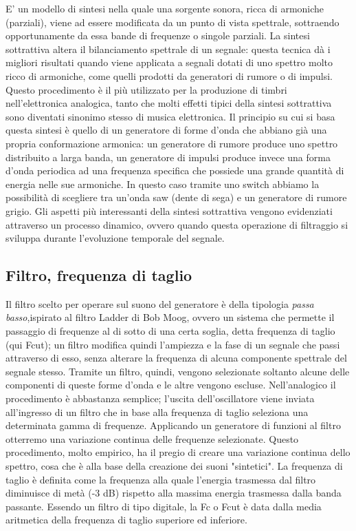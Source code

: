 \documentclass[
	a4paper,
	twocolumn
	]{article}
\begin{document}
E’ un modello di sintesi nella quale una sorgente sonora, ricca di armoniche
(parziali), viene ad essere modificata da un punto di vista spettrale,
sottraendo opportunamente da essa bande di frequenze o singole parziali. La
sintesi sottrattiva altera il bilanciamento spettrale di un segnale: questa
tecnica dà i migliori risultati quando viene applicata a segnali dotati di uno
spettro molto ricco di armoniche, come quelli prodotti da generatori di rumore
o di impulsi. Questo procedimento è il più utilizzato per la produzione di
timbri nell'elettronica analogica, tanto che molti effetti tipici della sintesi
sottrattiva sono diventati sinonimo stesso di musica elettronica. Il principio
su cui si basa questa sintesi è quello di un generatore di forme
d'onda che abbiano già una propria conformazione armonica: un generatore di
rumore produce uno spettro distribuito a larga banda, un generatore di impulsi
produce invece una forma d’onda periodica ad una frequenza specifica che
possiede una grande quantità di energia nelle sue armoniche. In questo caso
tramite uno switch abbiamo la possibilità di scegliere tra un’onda saw (dente
di sega) e un generatore di rumore grigio.
Gli aspetti più interessanti della sintesi sottrattiva vengono evidenziati
attraverso un processo dinamico, ovvero quando questa operazione di filtraggio
si sviluppa durante l’evoluzione temporale del segnale.

\subsection*{Filtro, frequenza di taglio}

Il filtro scelto per operare sul suono del generatore è della tipologia
\emph{passa basso},ispirato al filtro Ladder di Bob Moog, ovvero un sistema che
permette il passaggio di frequenze al di sotto di una certa soglia, detta
frequenza di taglio (qui Fcut); un filtro modifica quindi l’ampiezza e la fase
di un segnale che passi attraverso di esso, senza alterare la frequenza di
alcuna componente spettrale del segnale stesso.
Tramite un filtro, quindi, vengono selezionate soltanto alcune delle componenti
di queste forme d'onda e le altre vengono escluse. Nell'analogico il
procedimento è abbastanza semplice; l'uscita dell'oscillatore viene inviata
all'ingresso di un filtro che in base alla frequenza di taglio seleziona una
determinata gamma di frequenze. Applicando un generatore di funzioni al filtro
otterremo una variazione continua delle frequenze selezionate. Questo
procedimento, molto empirico, ha il pregio di creare una variazione continua
dello spettro, cosa che è alla base della creazione dei suoni "sintetici".
La frequenza di taglio è
definita come la frequenza alla quale l’energia trasmessa dal filtro diminuisce
di metà (-3 dB) rispetto alla massima energia trasmessa dalla banda passante.
Essendo un filtro di tipo digitale, la Fc o Fcut è data dalla media aritmetica
della frequenza di taglio superiore ed inferiore.
\end{document}
